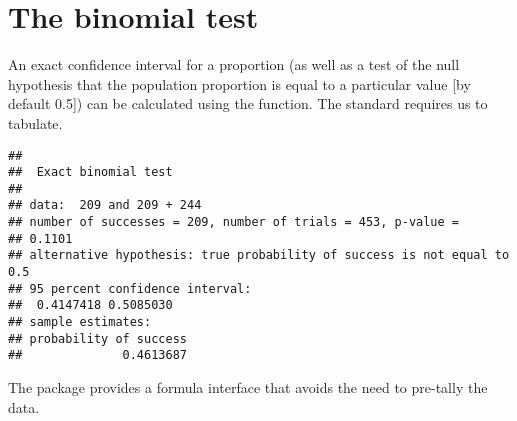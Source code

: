 \section{The binomial test}

%
%
An exact confidence interval for a proportion (as well as a test of the null 
hypothesis that the population proportion is equal to a particular value [by default 0.5]) can be calculated
using the  function.
The standard  requires us to tabulate.
\begin{knitrout}
\color{fgcolor}\begin{kframe}
\begin{alltt}
\hlstd{(}\hlstd{,}  \hlopt{+} \hlstd{)}
\end{alltt}
\begin{verbatim}
## 
## 	Exact binomial test
## 
## data:  209 and 209 + 244
## number of successes = 209, number of trials = 453, p-value =
## 0.1101
## alternative hypothesis: true probability of success is not equal to 0.5
## 95 percent confidence interval:
##  0.4147418 0.5085030
## sample estimates:
## probability of success 
##              0.4613687
\end{verbatim}
\end{kframe}
\end{knitrout}
The  package provides a formula interface that avoids the need to pre-tally
the data.
\begin{knitrout}
\color{fgcolor}\begin{kframe}
\begin{alltt}
 \hlkwb{<-} \hlstd{(}\hlopt{~} \hlopt{==}\hlstd{),} 
\end{alltt}


{\ttfamily\noindent\bfseries{}}\begin{alltt}
\end{alltt}


{\ttfamily\noindent\bfseries\color{errorcolor}{\#\# Error in eval(expr, envir, enclos): object 'result' not found}}\end{kframe}
\end{knitrout}

